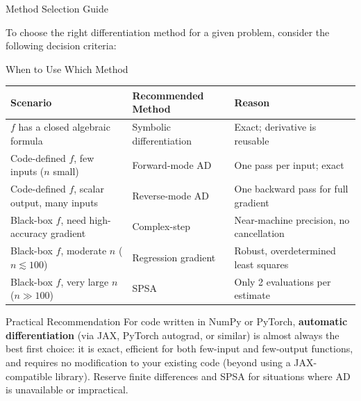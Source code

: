 \documentclass[aspectratio=169,10pt]{beamer}
\begin{document}
\begin{frame}[allowframebreaks]{Method Selection Guide}

  To choose the right differentiation method for a given problem, consider
  the following decision criteria:

  \begin{block}{When to Use Which Method}
    \renewcommand{\arraystretch}{1.6}
    \begin{tabular}{p{3.5cm}p{3.2cm}p{4.5cm}}
      \toprule
      \textbf{Scenario} & \textbf{Recommended Method} & \textbf{Reason} \\
      \midrule
      $f$ has a closed algebraic formula
        & Symbolic differentiation
        & Exact; derivative is reusable \\
      Code-defined $f$, few inputs ($n$ small)
        & Forward-mode AD
        & One pass per input; exact \\
      Code-defined $f$, scalar output, many inputs
        & Reverse-mode AD
        & One backward pass for full gradient \\
      Black-box $f$, need high-accuracy gradient
        & Complex-step
        & Near-machine precision, no cancellation \\
      Black-box $f$, moderate $n$ ($n \lesssim 100$)
        & Regression gradient
        & Robust, overdetermined least squares \\
      Black-box $f$, very large $n$ ($n \gg 100$)
        & SPSA
        & Only 2 evaluations per estimate \\
      \bottomrule
    \end{tabular}
  \end{block}

  \begin{alertblock}{Practical Recommendation}
    For code written in NumPy or PyTorch, \textbf{automatic differentiation}
    (via JAX, PyTorch autograd, or similar) is almost always the best first
    choice: it is exact, efficient for both few-input and few-output
    functions, and requires no modification to your existing code
    (beyond using a JAX-compatible library).
    Reserve finite differences and SPSA for situations where AD is
    unavailable or impractical.
  \end{alertblock}

\end{frame}
\end{document}
